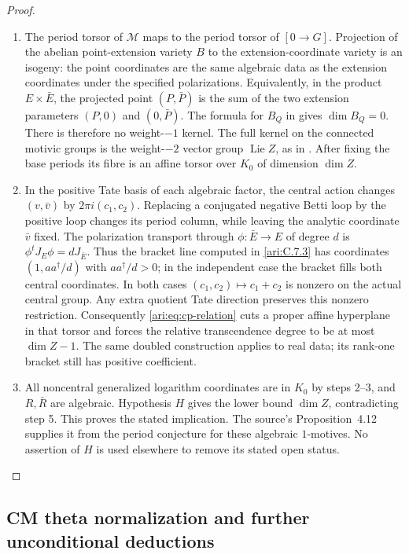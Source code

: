\begin{proof}
\begin{enumerate}[label=\arabic*.,leftmargin=*]
\item The period torsor of $\mathcal M$ maps to the period
torsor of $[0\to G]$. Projection of the abelian point-extension
variety $B$ to the extension-coordinate variety is an isogeny:
the point coordinates are the same algebraic data as the
extension coordinates under the specified polarizations.
Equivalently, in the product $E\times\bar E$, the projected
point $(P,\bar P)$ is the sum of the two extension parameters
$(P,0)$ and $(0,\bar P)$. The formula for $B_Q$ in
\cite[equation~(4.4), p.~19]{bertolin2022} gives $\dim B_Q=0$.
There is therefore no weight-$-1$ kernel. The full kernel on
the connected motivic groups is the weight-$-2$ vector group
$\operatorname{Lie}Z$, as in
\cite[Construction~3.4 and Lemma~3.5, pp.~12--13]{bertolin2022}.
After fixing the base periods its fibre is an affine torsor
over $K_0$ of dimension $\dim Z$.

\item In the positive Tate basis of each algebraic factor,
the central action changes $(v,\bar v)$ by
$2\pi i(c_1,c_2)$. Replacing a conjugated negative Betti loop
by the positive loop changes its period column, while leaving
the analytic coordinate $\bar v$ fixed. The polarization
transport through $\phi:\bar E\to E$ of degree $d$ is
$\phi^tJ_E\phi=dJ_{\bar E}$. Thus the bracket line computed
in \cref{ari:C.7.3} has coordinates
$(1,aa^\dagger/d)$ with $aa^\dagger/d>0$; in the independent
case the bracket fills both central coordinates. In both cases
$(c_1,c_2)\mapsto c_1+c_2$ is nonzero on the actual central
group. Any extra quotient Tate direction preserves this
nonzero restriction. Consequently \eqref{ari:eq:cp-relation}
cuts a proper affine hyperplane in that torsor and forces the
relative transcendence degree to be at most $\dim Z-1$.
The same doubled construction applies to real data; its
rank-one bracket still has positive coefficient.

\item All noncentral generalized logarithm coordinates are in
$K_0$ by steps 2--3, and $R,\bar R$ are algebraic. Hypothesis
$H$ gives the lower bound $\dim Z$, contradicting step 5.
This proves the stated implication. The source's
Proposition~4.12 supplies it from the period conjecture for
these algebraic $1$-motives. No assertion of $H$ is used
elsewhere to remove its stated open status.
\end{enumerate}
\end{proof}

\subsection{CM theta normalization and further unconditional deductions}

